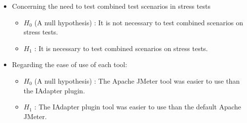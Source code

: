 \begin{itemize}

\item Concerning the need to test combined test scenarios in stress tests

\begin{itemize}
\item $H_{0}$ (A null hypothesis) : It is not necessary to test combined scenarios on stress tests.
\item $H_{1}$  : It is  necessary to test combined scenarios on stress tests.
\end{itemize}


\item Regarding the ease of use of each tool: 


\begin{itemize}
\item $H_{0}$ (A null hypothesis) : The Apache JMeter tool was easier to use than the IAdapter plugin.
\item $H_{1}$  : The IAdapter plugin tool was easier to use than the default Apache JMeter.
\end{itemize}

\end{itemize}


